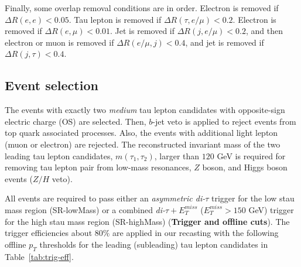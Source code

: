 \documentclass{ws-mpla}
\begin{document}
Finally, some overlap removal conditions are in order. {\color{blue}Electron is removed if $\Delta R(e,e) < 0.05$}. Tau lepton is removed if $\Delta R(\tau,e/\mu) < 0.2$. {\color{blue}Electron is removed if $\Delta R(e,\mu) < 0.01$. Jet is removed if $\Delta R(j,e/\mu) < 0.2$, and then electron or muon is removed if $\Delta R(e/\mu,j) < 0.4$, and jet is removed if $\Delta R(j,\tau) < 0.4$.}


\subsection{Event selection}


The events with exactly two \textit{medium} tau lepton candidates with opposite-sign electric charge (OS) are selected. 
Then, $b$-jet veto is applied to reject events from top quark associated processes.
Also, the events with additional light lepton (muon or electron) are rejected.
The reconstructed invariant mass of the two leading tau lepton candidates, $m(\tau_1,\tau_2)$, larger than $120$ GeV is required for removing tau lepton pair from low-mass resonances, $Z$ boson, and Higgs boson events ($Z/H$ veto).

All events are required to pass either an \textit{asymmetric di-$\tau$} trigger for the low stau mass region (SR-lowMass) or a combined \textit{di-$\tau +E^{miss}_T$} ($E^{miss}_T > 150$ GeV) trigger for the high stau mass region (SR-highMass) (\textbf{Trigger and offline cuts}).
The trigger efficiencies about $80\%$ are applied in our recasting with the following offline $p_T$ thresholds for the leading (subleading) tau lepton candidates in Table~\ref{tab:trig-eff}.
\end{document}
